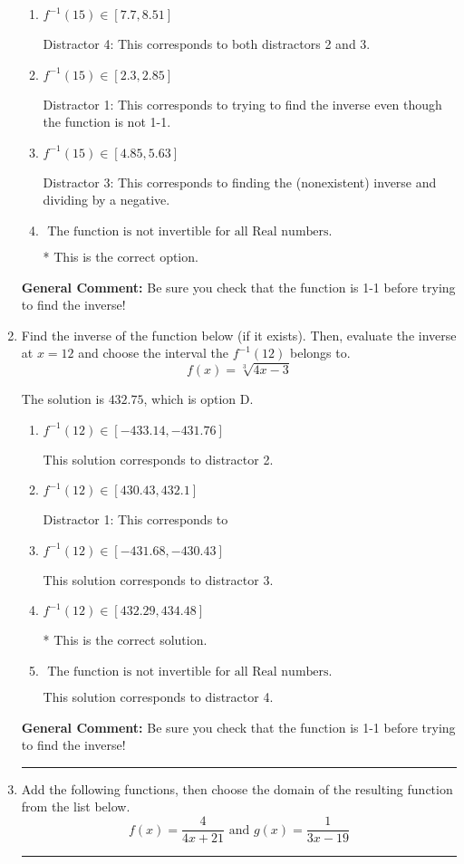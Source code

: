 \documentclass{extbook}[14pt]
\newcommand{\litem}[1]{\item #1

\rule{\textwidth}{0.4pt}}
\begin{document}
\begin{enumerate}
{\begin{enumerate}[label=\Alph*.]
 Distractor 2: This corresponds to finding the (nonexistent) inverse and not subtracting by the vertical shift.
\item \( f^{-1}(15) \in [7.7, 8.51] \)

 Distractor 4: This corresponds to both distractors 2 and 3.
\item \( f^{-1}(15) \in [2.3, 2.85] \)

 Distractor 1: This corresponds to trying to find the inverse even though the function is not 1-1. 
\item \( f^{-1}(15) \in [4.85, 5.63] \)

 Distractor 3: This corresponds to finding the (nonexistent) inverse and dividing by a negative.
\item \( \text{ The function is not invertible for all Real numbers. } \)

* This is the correct option.
\end{enumerate}

\textbf{General Comment:} Be sure you check that the function is 1-1 before trying to find the inverse!
}
\litem{
Find the inverse of the function below (if it exists). Then, evaluate the inverse at $x = 12$ and choose the interval the $f^{-1}(12)$ belongs to.
\[ f(x) = \sqrt[3]{4 x - 3} \]

The solution is \( 432.75 \), which is option D.\begin{enumerate}[label=\Alph*.]
\item \( f^{-1}(12) \in [-433.14, -431.76] \)

 This solution corresponds to distractor 2.
\item \( f^{-1}(12) \in [430.43, 432.1] \)

 Distractor 1: This corresponds to 
\item \( f^{-1}(12) \in [-431.68, -430.43] \)

 This solution corresponds to distractor 3.
\item \( f^{-1}(12) \in [432.29, 434.48] \)

* This is the correct solution.
\item \( \text{ The function is not invertible for all Real numbers. } \)

 This solution corresponds to distractor 4.
\end{enumerate}

\textbf{General Comment:} Be sure you check that the function is 1-1 before trying to find the inverse!
}
\litem{
Add the following functions, then choose the domain of the resulting function from the list below.
\[ f(x) = \frac{4}{4x+21} \text{ and } g(x) = \frac{1}{3x-19} \]

}
\end{enumerate}
\end{document}
